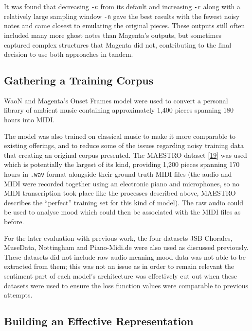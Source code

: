 \documentclass[12pt,]{article}
\begin{document}
It was found that decreasing \texttt{-c} from its default and increasing
\texttt{-r} along with a relatively large sampling window \texttt{-n}
gave the best results with the fewest noisy notes and came closest to
emulating the original pieces. These outputs still often included many
more ghost notes than Magenta's outputs, but sometimes captured complex
structures that Magenta did not, contributing to the final decision to
use both approaches in tandem.

\hypertarget{gathering-a-training-corpus}{%
\subsection{Gathering a Training
Corpus}\label{gathering-a-training-corpus}}

WaoN and Magenta's Onset Frames model were used to convert a personal
library of ambient music containing approximately 1,400 pieces spanning
180 hours into MIDI.

The model was also trained on classical music to make it more comparable
to existing offerings, and to reduce some of the issues regarding noisy
training data that creating an original corpus presented. The MAESTRO
dataset {[}\protect\hyperlink{ref-maestro2018}{19}{]} was used which is
potentially the largest of its kind, providing 1,200 pieces spanning 170
hours in \texttt{.wav} format alongside their ground truth MIDI files
(the audio and MIDI were recorded together using an electronic piano and
microphones, so no MIDI transcription took place like the processes
described above, MAESTRO describes the ``perfect'' training set for this
kind of model). The raw audio could be used to analyse mood which could
then be associated with the MIDI files as before.

For the later evaluation with previous work, the four datasets JSB
Chorales, MuseData, Nottingham and Piano-Midi.de were also used as
discussed previously. These datasets did not include raw audio meaning
mood data was not able to be extracted from them; this was not an issue
as in order to remain relevant the sentiment part of each model's
architecture was effectively cut out when these datasets were used to
ensure the loss function values were comparable to previous attempts.

\hypertarget{building-an-effective-representation}{%
\subsection{Building an Effective
Representation}\label{building-an-effective-representation}}
\end{document}
